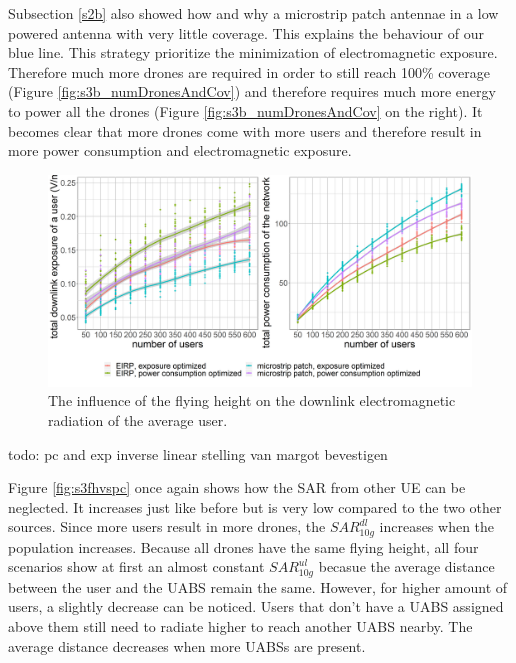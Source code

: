 Subsection \ref{s2b} also showed how and why a microstrip patch antennae in a low powered antenna with very little coverage. This 
explains the behaviour of our blue line. This strategy prioritize the minimization of electromagnetic exposure. Therefore much more 
drones are required in order to still reach 100\% coverage (Figure \ref{fig:s3b_numDronesAndCov}) and therefore requires much more energy 
to power all the drones (Figure \ref{fig:s3b_numDronesAndCov} on the right).
It becomes clear that more drones come with more users  and therefore result in more power consumption and electromagnetic exposure.


\begin{figure}[h!]
  \includegraphics[width=\textwidth]{../results/s3/uvsdlAndPc.png}
  \caption{The influence of the flying height on the downlink electromagnetic radiation of the average user.}
  \label{fig:s3b_dlAndPC}
\end{figure}
todo: pc and exp inverse linear stelling van margot bevestigen

Figure \ref{fig:s3fhvspc} once again shows how the \gls{SAR} from other \gls{UE} can be neglected. It increases just like before but is very 
low compared to the two other sources. Since more users result in more drones, the $SAR^{dl}_{10g}$ increases when the population 
increases. Because all drones have the same flying height, all four scenarios show at first an almost constant $SAR^{ul}_{10g}$ becasue the average 
distance between the user and the \gls{UABS} remain the same. However, for higher amount of users, a slightly decrease can be noticed.
Users that don't have a \gls{UABS} assigned above them still need to radiate higher to reach another \gls{UABS} nearby. The average distance 
decreases when more \gls{UABS}s are present.

